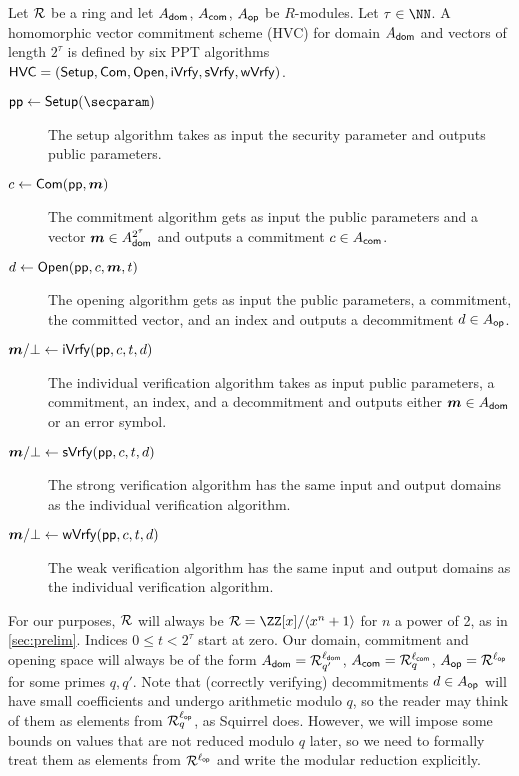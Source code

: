 \begin{definition}\label{def:hvc}
  Let $\mathcal{R}$ be a ring and let $A_{\mathsf{dom}}$, $A_{\mathsf{com}}$, $A_{\mathsf{op}}$ be $R$-modules. Let $\tau\in\NN$.
  A homomorphic vector commitment scheme (HVC) for domain $A_{\mathsf{dom}}$ and vectors of length $2^\tau$ is defined by six PPT algorithms $\mathsf{HVC}=(\mathsf{Setup},\mathsf{Com},\allowbreak\mathsf{Open},\mathsf{iVrfy},\mathsf{sVrfy}, \mathsf{wVrfy})$.
\begin{description}
    \item[$\params\gets\setup(\secparam)$] The setup algorithm takes as input the security parameter and outputs public parameters.
    \item[$c \gets \mathsf{Com}(\mathsf{pp},\boldsymbol{m})$] The commitment algorithm gets as input the public parameters and a vector $\boldsymbol{m}\in A_{\mathsf{dom}}^{2^\tau}$ and outputs a commitment $c\in A_{\mathsf{com}}$.
    \item[$d \gets \mathsf{Open}(\mathsf{pp},c,\boldsymbol{m},t)$] The opening algorithm gets as input the public parameters, a commitment, the committed vector, and an index and outputs a decommitment $d\in A_{\mathsf{op}}$.
    \item[$\boldsymbol{m}/\bot\gets \mathsf{iVrfy}(\mathsf{pp},c,t,d)$] The individual verification algorithm takes as input public parameters, a commitment, an index, and a decommitment and outputs either $\boldsymbol{m}\in A_{\mathsf{dom}}$ or an error symbol.
    \item[$\boldsymbol{m}/\bot\gets \mathsf{sVrfy}(\mathsf{pp},c,t,d)$] The strong verification algorithm has the same input and output domains as the individual verification algorithm.
    \item[$\boldsymbol{m}/\bot\gets \mathsf{wVrfy}(\mathsf{pp},c,t,d)$] The weak verification algorithm has the same input and output domains as the individual verification algorithm.
  \end{description}
\end{definition}
For our purposes, $\mathcal{R}$ will always be $\ring = \ZZ[x]/\langle x^n+1\rangle$ for $n$ a power of 2, as in \autoref{sec:prelim}.
Indices $0\leq t < 2^\tau$ start at zero.
Our domain, commitment and opening space will always be of the form $A_{\mathsf{dom}} = \mathcal{R}_{q'}^{\ell_{\mathsf{dom}}}$, $A_{\mathsf{com}} = \mathcal{R}_q^{\ell_{\mathsf{com}}}$, $A_{\mathsf{op}} = \mathcal{R}^{\ell_{\mathsf{op}}}$ for some primes $q,q'$.
Note that (correctly verifying) decommitments $d\in A_{\mathsf{op}}$ will have small coefficients and undergo arithmetic modulo $q$, so the reader may think of them as elements from $\mathcal{R}_q^{\ell_{\mathsf{op}}}$, as Squirrel \cite{CCS:FleSimZha22} does.
However, we will impose some bounds on values that are not reduced modulo $q$ later, so we need to formally treat them as elements from $\mathcal{R}^{\ell_{\mathsf{op}}}$ and write the modular reduction explicitly.

